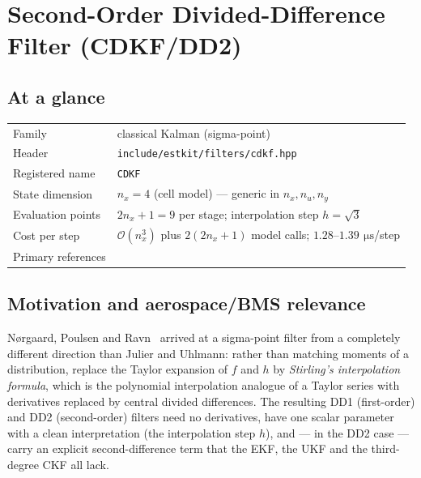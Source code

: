 \chapter{Second-Order Divided-Difference Filter (CDKF/DD2)}
\label{ch:cdkf}

\section*{At a glance}
\begin{tabular}{@{}l>{\raggedright\arraybackslash}p{}@{}}
Family & classical Kalman (sigma-point) \\
Header & \texttt{include/estkit/filters/cdkf.hpp} \\
Registered name & \texttt{CDKF} \\
State dimension & $n_x = 4$ (cell model) --- generic in $n_x, n_u, n_y$ \\
Evaluation points & $2n_x+1 = 9$ per stage; interpolation step $h=\sqrt3$ \\
Cost per step & $\mathcal{O}(n_x^3)$ plus $2(2n_x{+}1)$ model calls; $1.28$--$1.39\,\SI{}{\micro\second}$/step \\
Primary references & \cite{norgaard2000,ito2000gaussian,schei1997,vandermerwe2001srukf} \\
\end{tabular}

\section{Motivation and aerospace/BMS relevance}
Nørgaard, Poulsen and Ravn~\cite{norgaard2000} arrived at a sigma-point filter from a
completely different direction than Julier and Uhlmann: rather than matching moments of a
distribution, replace the Taylor expansion of $f$ and $h$ by \emph{Stirling's interpolation
formula}, which is the polynomial interpolation analogue of a Taylor series with derivatives
replaced by central divided differences. The resulting DD1 (first-order) and DD2
(second-order) filters need no derivatives, have one scalar parameter with a clean
interpretation (the interpolation step $h$), and --- in the DD2 case --- carry an explicit
second-difference term that the EKF, the UKF and the third-degree CKF all lack.

